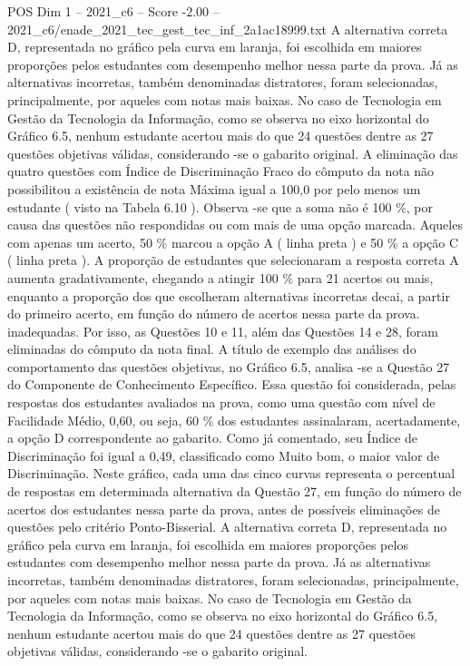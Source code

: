 \begin{textsample}{POS Dim 1 – 2021\_c6 – Score -2.00 – 2021\_c6/enade\_2021\_tec\_gest\_tec\_inf\_2a1ac18999.txt}
A alternativa correta D, representada no gráfico pela curva em laranja, foi escolhida em maiores proporções pelos estudantes com desempenho melhor nessa parte da prova.
Já as alternativas incorretas, também denominadas distratores, foram selecionadas, principalmente, por aqueles com notas mais baixas.
No caso de Tecnologia em Gestão da Tecnologia da Informação, como se observa no eixo horizontal do Gráfico 6.5, nenhum estudante acertou mais do que 24 questões dentre as 27 questões objetivas válidas, considerando -se o gabarito original.
A eliminação das quatro questões com Índice de Discriminação Fraco do cômputo da nota não possibilitou a existência de nota Máxima igual a 100,0 por pelo menos um estudante ( visto na Tabela 6.10 ).
Observa -se que a soma não é 100 \%, por causa das questões não respondidas ou com mais de uma opção marcada.
Aqueles com apenas um acerto, 50 \% marcou a opção A ( linha preta ) e 50 \% a opção C ( linha preta ).
A proporção de estudantes que selecionaram a resposta correta A aumenta gradativamente, chegando a atingir 100 \% para 21 acertos ou mais, enquanto a proporção dos que escolheram alternativas incorretas decai, a partir do primeiro acerto, em função do número de acertos nessa parte da prova. inadequadas.
Por isso, as Questões 10 e 11, além das Questões 14 e 28, foram eliminadas do cômputo da nota final.
A título de exemplo das análises do comportamento das questões objetivas, no Gráfico 6.5, analisa -se a Questão 27 do Componente de Conhecimento Específico.
Essa questão foi considerada, pelas respostas dos estudantes avaliados na prova, como uma questão com nível de Facilidade Médio, 0,60, ou seja, 60 \% dos estudantes assinalaram, acertadamente, a opção D correspondente ao gabarito.
Como já comentado, seu Índice de Discriminação foi igual a 0,49, classificado como Muito bom, o maior valor de Discriminação.
Neste gráfico, cada uma das cinco curvas representa o percentual de respostas em determinada alternativa da Questão 27, em função do número de acertos dos estudantes nessa parte da prova, antes de possíveis eliminações de questões pelo critério Ponto-Bisserial.
A alternativa correta D, representada no gráfico pela curva em laranja, foi escolhida em maiores proporções pelos estudantes com desempenho melhor nessa parte da prova.
Já as alternativas incorretas, também denominadas distratores, foram selecionadas, principalmente, por aqueles com notas mais baixas.
No caso de Tecnologia em Gestão da Tecnologia da Informação, como se observa no eixo horizontal do Gráfico 6.5, nenhum estudante acertou mais do que 24 questões dentre as 27 questões objetivas válidas, considerando -se o gabarito original.

\end{textsample}
